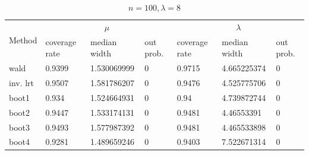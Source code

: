 \documentclass{article}
\begin{document}
\begin{table}
        \begin{subtable}[b]{\textwidth}
		\centering
		\begin{tabular}{l|lll|lll}
		\toprule
        \multirow{2}{*}{Method} & \multicolumn{3}{c|}{$\mu$}      & \multicolumn{3}{c}{$\lambda$}  \\ 
                           & coverage rate & median width & out prob. & coverage rate & median width & out prob. \\
                           \midrule
wald      & 0.9399	&1.530069999	&0 & 0.9715	&4.665225374   	&0 \\
inv. lrt  & 0.9507	&1.581786207	&0 & 0.9476	&4.525775706   	&0 \\
boot1     & 0.934	&1.524664931	&0 & 0.94	&4.739872744   	&0 \\
boot2     & 0.9447	&1.533174131	&0 & 0.9481	&4.46553391	    &0 \\
boot3     & 0.9493	&1.577987392	&0 & 0.9481	&4.465533898   	&0 \\
boot4     & 0.9281	&1.489659246	&0 & 0.9403	&7.522671314   	&0 \\
       \bottomrule
       \end{tabular}
       \caption{$n = 100, \lambda = 8$}
       \label{100_8}
       \end{subtable}%
       \end{table}
\end{document}
